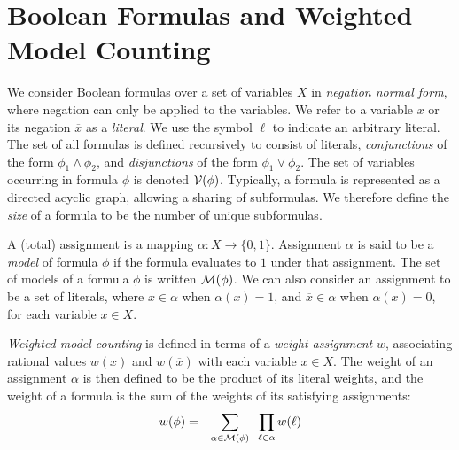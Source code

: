 \documentclass[
hf
]{ceurart}
\newcommand{\obar}[1]{\overline{#1}}
\newcommand{\lit}{\ell}
\newcommand{\varset}{X}
\newcommand{\dependencyset}{{\cal V}}
\newcommand{\assign}{\alpha}
\newcommand{\modelset}{{\cal M}}
\begin{document}
\section{Boolean Formulas and Weighted Model Counting}
\label{sect:background:boolean}

We consider Boolean formulas over a set of variables $\varset$ in
\emph{negation normal form}, where negation can only be applied to the
variables.  We refer to a variable $x$ or its negation $\obar{x}$ as a
\emph{literal}.  We use the symbol $\lit$ to indicate an arbitrary
literal.  The set of all formulas is defined recursively to consist of
literals, \emph{conjunctions} of the form $\phi_1 \land \phi_2$, and
\emph{disjunctions} of the form $\phi_1 \lor \phi_2$.  The set of
variables occurring in formula $\phi$ is denoted
$\dependencyset(\phi)$.  Typically, a formula is represented as a
directed acyclic graph, allowing a sharing of subformulas.  We
therefore define the \emph{size} of a formula to be the number of
unique subformulas.

A (total) assignment is a mapping $\assign \colon \varset \rightarrow
\{0, 1\}$.  Assignment $\assign$ is said to be a \emph{model} of
formula $\phi$ if the formula evaluates to $1$ under that assignment.
The set of models of a formula $\phi$ is written $\modelset(\phi)$.
We can also consider an assignment to be a set of literals, where $x \in \assign$
when $\assign(x) = 1$, and $\obar{x} \in \assign$ when
$\assign(x) = 0$, for each variable $x \in \varset$.

\emph{Weighted model counting} is defined in terms of a \emph{weight
  assignment} $w$, associating rational values $w(x)$ and
$w(\obar{x})$ with each variable $x \in \varset$.
The weight of an
assignment $\assign$ is then defined to be the product of its literal weights, and the weight
of a formula is the sum of the weights of its satisfying assignments:
\begin{eqnarray}
  w(\phi) & = & \sum_{\assign \in \modelset(\phi)} \;\;\prod_{\lit \in \assign} w(\lit) \label{eqn:wmc}
\end{eqnarray}
\end{document}
